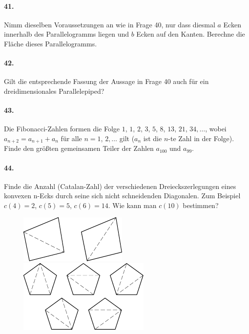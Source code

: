 \documentclass[10pt,a5paper,twoside]{article}
\newenvironment{problem}[1]{\paragraph*{#1}}{}
\begin{document}
\begin{problem}{41.}
	Nimm dieselben Voraussetzungen an wie in Frage 40, nur dass diesmal $a$ Ecken innerhalb des Parallelogramms liegen und $b$ Ecken auf den Kanten. Berechne die Fläche dieses Parallelogramms.
\end{problem}

\begin{problem}{42.}
	Gilt die entsprechende Fassung der Aussage in Frage 40 auch für ein dreidimensionales Parallelepiped?
\end{problem}

\begin{problem}{43.}
	Die Fibonacci-Zahlen formen die Folge $1$, $1$, $2$, $3$, $5$, $8$, $13$, $21$,
	$34,\dotsc$, wobei $a_{n+2}=a_{n+1}+a_n$ für alle
	$n=1$, $2,\dotsc$ gilt ($a_n$ ist die $n$-te Zahl in der Folge). Finde den größten gemeinsamen Teiler der Zahlen $a_{100}$ und $a_{99}$.
\end{problem}

\begin{problem}{44.}
	Finde die Anzahl (Catalan-Zahl) der verschiedenen Dreieckszerlegungen eines konvexen n-Ecks durch seine sich nicht schneidenden Diagonalen.
	Zum Beispiel $c(4)=2$, $c(5)=5$, $c(6)=14$. Wie kann man $c(10)$ bestimmen?
	\begin{figure}[H]
	\centering
	\includegraphics[scale=1]{taskbook-281}
	\qquad
	\includegraphics[scale=1]{taskbook-282}
	\end{figure}
\end{problem}
\end{document}
